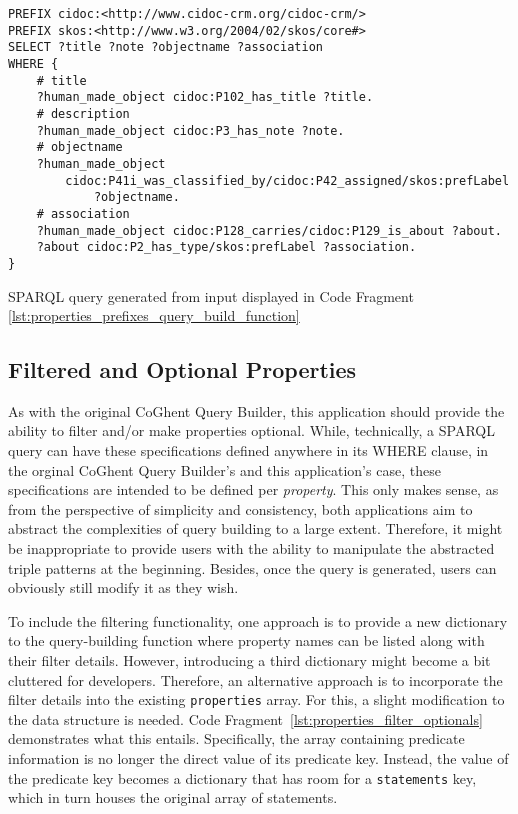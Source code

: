 \begin{listing}[htbp]
    \begin{verbatim}
PREFIX cidoc:<http://www.cidoc-crm.org/cidoc-crm/>
PREFIX skos:<http://www.w3.org/2004/02/skos/core#>
SELECT ?title ?note ?objectname ?association
WHERE {
    # title
    ?human_made_object cidoc:P102_has_title ?title.
    # description
    ?human_made_object cidoc:P3_has_note ?note.
    # objectname
    ?human_made_object
        cidoc:P41i_was_classified_by/cidoc:P42_assigned/skos:prefLabel
            ?objectname.
    # association
    ?human_made_object cidoc:P128_carries/cidoc:P129_is_about ?about.
    ?about cidoc:P2_has_type/skos:prefLabel ?association.
}
    \end{verbatim}
    \caption{SPARQL query generated from input displayed in Code Fragment \ref{lst:properties_prefixes_query_build_function}}
    \label{lst:query_generated_edge_cases}
\end{listing}

\subsection{Filtered and Optional Properties}
\label{subsec:filter_optional_properties}

As with the original CoGhent Query Builder, this application should provide the ability to filter and/or make properties optional. While, technically, a SPARQL query can have these specifications defined anywhere in its WHERE clause, in the orginal CoGhent Query Builder's and this application's case, these specifications are intended to be defined per \textit{property}. This only makes sense, as from the perspective of simplicity and consistency, both applications aim to abstract the complexities of query building to a large extent. Therefore, it might be inappropriate to provide users with the ability to manipulate the abstracted triple patterns at the beginning. Besides, once the query is generated, users can obviously still modify it as they wish.

To include the filtering functionality, one approach is to provide a new dictionary to the query-building function where property names can be listed along with their filter details. However, introducing a third dictionary might become a bit cluttered for developers. Therefore, an alternative approach is to incorporate the filter details into the existing \texttt{properties} array. For this, a slight modification to the data structure is needed. Code Fragment~\ref{lst:properties_filter_optionals} demonstrates what this entails. Specifically, the array containing predicate information is no longer the direct value of its predicate key. Instead, the value of the predicate key becomes a dictionary that has room for a \texttt{statements} key, which in turn houses the original array of statements.

